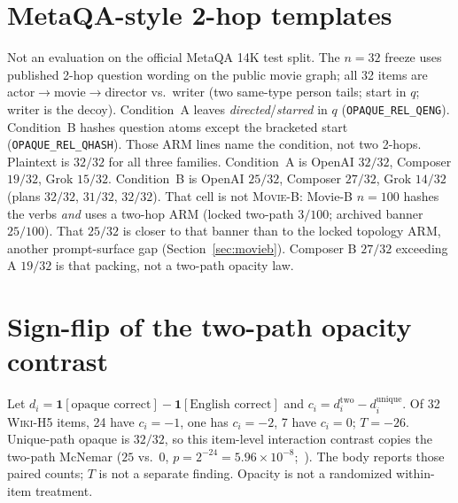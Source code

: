 \documentclass[10pt]{article} %
\begin{document}
\FloatBarrier
\section{MetaQA-style 2-hop templates}
\label{app:extended}
\label{app:metaqa32}

Not an evaluation on the official MetaQA 14K test split.
The $n{=}32$ freeze uses published 2-hop question wording on the public
movie graph; all 32 items are actor$\to$movie$\to$director vs.\ writer
(two same-type person tails; start in $q$; writer is the decoy).
Condition~A leaves \emph{directed}/\emph{starred} in $q$
(\texttt{OPAQUE\_REL\_QENG}).
Condition~B hashes question atoms except the bracketed start
(\texttt{OPAQUE\_REL\_QHASH}).
Those ARM lines name the condition, not two 2-hops.
Plaintext is $32/32$ for all three families.
Condition~A is OpenAI $32/32$, Composer $19/32$, Grok $15/32$.
Condition~B is OpenAI $25/32$, Composer $27/32$, Grok $14/32$
(plans $32/32$, $31/32$, $32/32$).
That cell is not \textsc{Movie-B}: Movie-B $n{=}100$ hashes the verbs
\emph{and} uses a two-hop ARM (locked two-path $3/100$; archived banner
$25/100$).
That $25/32$ is closer to that banner than to the locked topology
ARM, another prompt-surface gap
(Section~\ref{sec:movieb}).
Composer B $27/32$ exceeding A $19/32$ is that packing, not a two-path
opacity law.

\section{Sign-flip of the two-path opacity contrast}
\label{app:signflip}

Let $d_i=\mathbf{1}[\text{opaque correct}]-\mathbf{1}[\text{English correct}]$
and $c_i=d^{\mathrm{two}}_i-d^{\mathrm{unique}}_i$.
Of 32 \textsc{Wiki-H5} items, 24 have $c_i{=}{-1}$, one has $c_i{=}{-2}$,
7 have $c_i{=}0$; $T{=}{-}26$.
Unique-path opaque is $32/32$, so this item-level interaction contrast
copies the two-path McNemar ($25$ vs.\ $0$,
$p{=}2^{-24}{=}5.96{\times}10^{-8}$;~\citealp{mcnemar1947}).
The body reports those paired counts; $T$ is not a separate finding.
Opacity is not a randomized within-item treatment.
\end{document}
